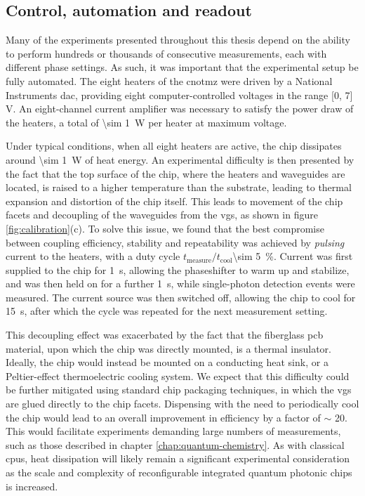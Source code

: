 \subsection{Control, automation and readout} 
\label{sec:control-automation-readout}
Many of the experiments presented throughout this thesis depend on the ability to perform hundreds or thousands of consecutive measurements, each with different phase settings. As such, it was important that the experimental setup be fully automated.  The eight heaters of the \gls{cnotmz} were driven by a National Instruments \gls{dac}, providing eight computer-controlled voltages in the range [0, 7] \si{\volt}. An eight-channel current amplifier was necessary to satisfy the power draw of the heaters, a total of  \SI{\sim 1}{\watt} per heater at maximum voltage.

Under typical conditions, when all eight heaters are active, the chip dissipates around \SI{\sim 1}{\watt} of heat energy. An experimental difficulty is then presented by the fact that the top surface of the chip, where the heaters and waveguides are located, is raised to a higher temperature than the substrate, leading to thermal expansion and distortion of the chip itself. This leads to movement of the chip facets and decoupling of the waveguides from the \glspl{vg}, as shown in figure \ref{fig:calibration}(c). To solve this issue, we found that the best compromise between coupling efficiency, stability and repeatability was achieved by \emph{pulsing} current to the heaters, with a duty cycle $t_\mathrm{measure}/t_\mathrm{cool}$\SI{\sim 5}{\percent}. Current was first supplied to the chip for \SI{1}{\second}, allowing the phaseshifter to warm up and stabilize, and was then held on for a further \SI{1}{\second}, while single-photon detection events were measured. The current source was then switched off, allowing the chip to cool for \SI{15}{\second}, after which the cycle was repeated for the next measurement setting.  

This decoupling effect was exacerbated by the fact that the fiberglass \gls{pcb} material, upon which the chip was directly mounted, is a thermal insulator. 
Ideally, the chip would instead be mounted on a conducting heat sink, or a Peltier-effect thermoelectric cooling system.
We expect that this difficulty could be further mitigated using standard chip packaging techniques, in which the \glspl{vg} are glued directly to the chip facets. Dispensing with the need to periodically cool the chip would lead to an overall improvement in efficiency by a factor of $\sim$ 20.  
This would facilitate experiments demanding large numbers of measurements, such as those described in chapter \ref{chap:quantum-chemistry}.
As with classical \glspl{cpu}, heat dissipation will likely remain a significant experimental consideration as the scale and complexity of reconfigurable integrated quantum photonic chips is increased.

